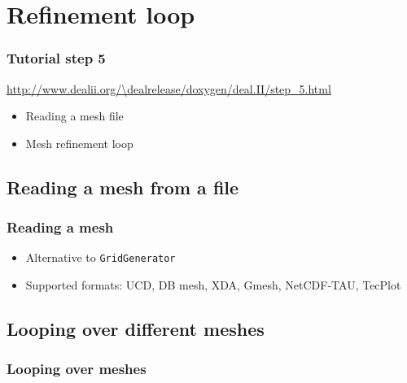 
\section[Refinement]{Refinement loop}

\begin{frame}
  \frametitle{Tutorial step 5}
  {\footnotesize{\url{http://www.dealii.org/\dealrelease/doxygen/deal.II/step_5.html}}}
  \begin{itemize}
  \item Reading a mesh file
  \item Mesh refinement loop
  \end{itemize}
\end{frame}

\subsection{Reading a mesh from a file}
\begin{frame}
  \frametitle{Reading a mesh}
  \begin{block}{}
        
  \end{block}
  \begin{itemize}
  \item Alternative to \lstinline!GridGenerator!
  \item Supported formats: UCD, DB mesh, XDA, Gmesh, NetCDF-TAU, TecPlot
  \end{itemize}
\end{frame}

\subsection{Looping over different meshes}
\begin{frame}
  \frametitle{Looping over meshes}
  \begin{block}{}
    
  \end{block}  
\end{frame}

